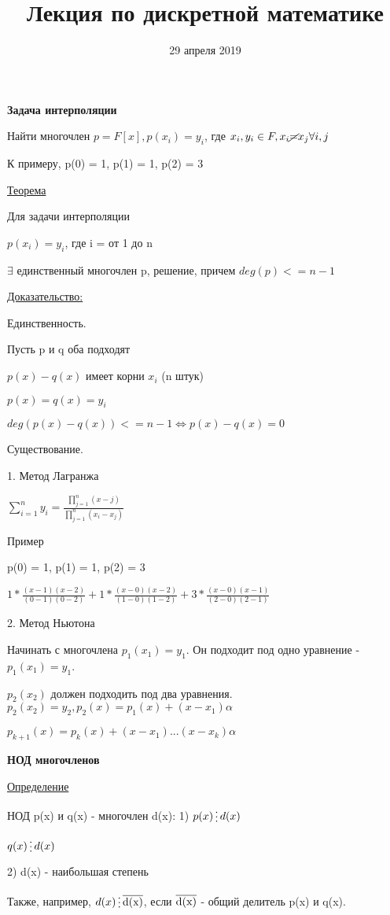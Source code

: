 \documentclass{article}
\title{Лекция по дискретной математике}
\date{29 апреля 2019}
\begin{document}
 
\maketitle

\textbf{Задача интерполяции}

Найти многочлен $p = F[x], p(x_i) = y_i$, где $x_i, y_i \in F, x_i \cancel = x_j \forall i, j$

К примеру, p(0) = 1, p(1) = 1, p(2) = 3

\underline{Теорема}

Для задачи интерполяции 

$p(x_i) = y_i$, где i = от 1 до n

$\exists$ единственный многочлен p, решение, причем $deg (p) <= n-1$

\underline{Доказательство:}

Единственность.

Пусть p и q оба подходят

$p(x) - q(x)$ имеет корни $x_i$ (n штук)

$p(x) = q(x) = y_i$

$deg (p(x) - q(x)) <= n-1 \Leftrightarrow p(x) - q(x) = 0 $

Существование.

1. Метод Лагранжа

$\sum^n_{i=1} y_i = \frac{\prod^n_{j=1} (x-j)}{\prod^n_{j=1} (x_i - x_j)}$

Пример

p(0) = 1, p(1) = 1, p(2) = 3

$1 \ast \frac{(x-1)(x-2)}{(0-1)(0-2)} + 1 \ast \frac{(x-0)(x-2)}{(1-0)(1-2)} + 3 \ast \frac{(x-0)(x-1)}{(2-0)(2-1)}$


2. Метод Ньютона

Начинать с многочлена $p_1(x_1) = y_1$. Он подходит под одно уравнение - $p_1(x_1) = y_1$.

$p_2(x_2)$ должен подходить под два уравнения. $p_2(x_2) = y_2, p_2(x) = p_1(x) + (x-x_1) \alpha$

$p_{k+1}(x) = p_k(x) + (x-x_1) ... (x-x_k) \alpha$


\textbf{НОД многочленов}

\underline{Определение}

НОД p(x) и q(x) - многочлен d(x):
1) $p(x) \mathop{\raisebox{-2pt}{\vdots}} d(x)$

$q(x) \mathop{\raisebox{-2pt}{\vdots}} d(x)$

2) d(x) - наибольшая степень

Также, например, $d(x) \mathop{\raisebox{-2pt}{\vdots}} \overline{\rm d(x)}$, если $\overline{\rm d(x)}$ - общий делитель p(x) и q(x).
\end{document}
